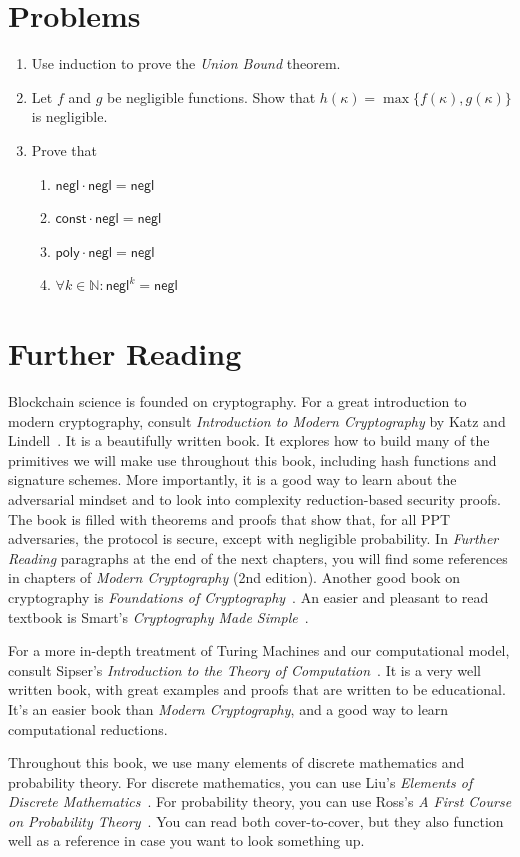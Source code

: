 \section*{Problems}

\begin{enumerate}
  \item Use induction to prove the \emph{Union Bound} theorem.
  \item Let $f$ and $g$ be negligible functions. Show that $h(\kappa) = \max\{f(\kappa), g(\kappa)\}$
        is negligible.
  \item Prove that
    \begin{enumerate}
      \item $\textsf{negl} \cdot \textsf{negl} = \textsf{negl}$
      \item $\textsf{const} \cdot \textsf{negl} = \textsf{negl}$
      \item $\textsf{poly} \cdot \textsf{negl} = \textsf{negl}$
      \item $\forall k \in \mathbb{N}: \textsf{negl}^k = \textsf{negl}$
    \end{enumerate}
\end{enumerate}

\section*{Further Reading}

Blockchain science is founded on cryptography. For a great introduction to modern cryptography,
consult \emph{Introduction to Modern Cryptography} by Katz and Lindell~\cite{katz}. It is a beautifully
written book. It explores how to build many of the primitives we will make use throughout this book,
including hash functions and signature schemes. More importantly, it is a good way to learn about the
adversarial mindset and to look into complexity reduction-based security proofs. The book is filled with
theorems and proofs that show that, for all PPT adversaries, the protocol is secure, except with negligible
probability. In \emph{Further Reading} paragraphs at the end of the next chapters, you will find
some references in chapters of \emph{Modern Cryptography} (2nd edition).
Another good book on cryptography is \emph{Foundations of Cryptography}~\cite{foundations1,foundations2}.
An easier and pleasant to read textbook is Smart's \emph{Cryptography Made Simple}~\cite{smart}.

For a more in-depth treatment of Turing Machines and our computational model, consult Sipser's
\emph{Introduction to the Theory of Computation}~\cite{sipser}. It is a very well written book,
with great examples and proofs that are written to be educational. It's an easier book than
\emph{Modern Cryptography}, and a good way to learn computational reductions.

Throughout this book, we use many elements of discrete mathematics and probability theory. For
discrete mathematics, you can use Liu's \emph{Elements of Discrete Mathematics}~\cite{liu}.
For probability theory, you can use Ross's
\emph{A First Course on Probability Theory}~\cite{ross}. You can read both cover-to-cover, but
they also function well as a reference in case you want to look something up.
